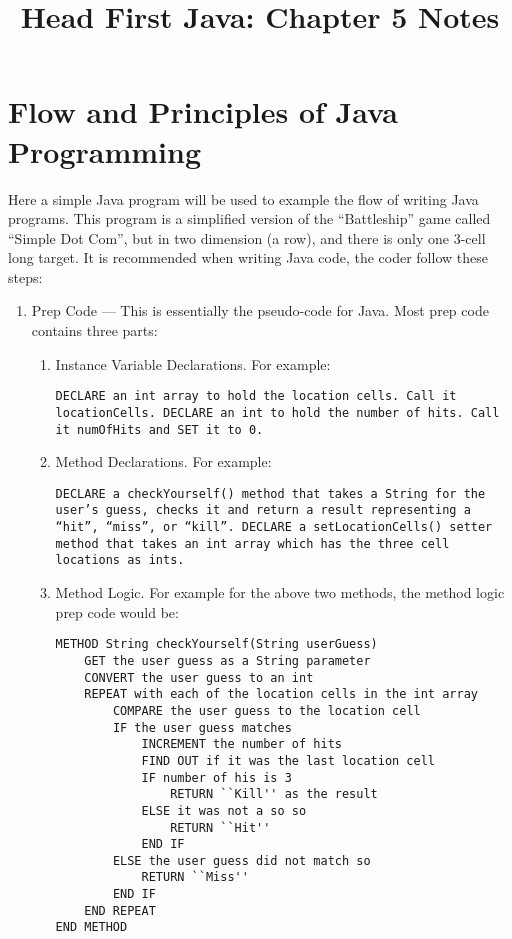 \documentclass{tufte-handout}
\title{Head First Java: Chapter 5 Notes}
\begin{document}
    \maketitle

    \section*{Flow and Principles of Java Programming}
    Here a simple Java program will be used to example the flow of writing Java programs. This program is a simplified version of the ``Battleship'' game called ``Simple Dot Com'', but in two dimension (a row), and there is only one 3-cell long target. It is recommended when writing Java code, the coder follow these steps:
    \begin{enumerate}
        \item Prep Code --- This is essentially the pseudo-code for Java. Most prep code contains three parts:
        \begin{enumerate}
            \item Instance Variable Declarations. For example:
            
            \texttt{DECLARE an int array to hold the location cells. Call it locationCells.\newline
            DECLARE an int to hold the number of hits. Call it numOfHits and SET it to 0.}
            
            \item Method Declarations. For example:

            \texttt{DECLARE a checkYourself() method that takes a String for the user's guess, checks it and return a result representing a ``hit'', ``miss'', or ``kill''.\newline
            DECLARE a setLocationCells() setter method that takes an int array which has the three cell locations as ints.}

            \item Method Logic. For example for the above two methods, the method logic prep code would be:
            \begin{lstlisting}
METHOD String checkYourself(String userGuess)
    GET the user guess as a String parameter
    CONVERT the user guess to an int
    REPEAT with each of the location cells in the int array
        COMPARE the user guess to the location cell
        IF the user guess matches
            INCREMENT the number of hits
            FIND OUT if it was the last location cell
            IF number of his is 3
                RETURN ``Kill'' as the result
            ELSE it was not a so so
                RETURN ``Hit''
            END IF
        ELSE the user guess did not match so
            RETURN ``Miss''
        END IF
    END REPEAT
END METHOD


\end{lstlisting}
\end{enumerate}
\end{enumerate}
\end{document}
